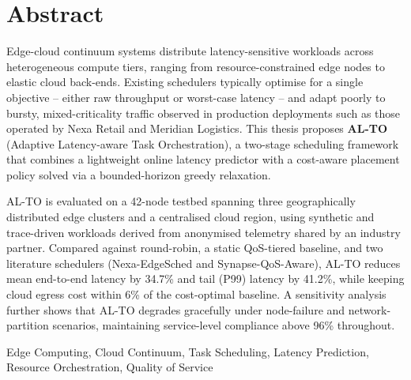 \chapter*{Abstract}

\noindent Edge-cloud continuum systems distribute latency-sensitive workloads across heterogeneous compute tiers, ranging from resource-constrained edge nodes to elastic cloud back-ends. Existing schedulers typically optimise for a single objective -- either raw throughput or worst-case latency -- and adapt poorly to bursty, mixed-criticality traffic observed in production deployments such as those operated by Nexa Retail and Meridian Logistics. This thesis proposes \textbf{AL-TO} (Adaptive Latency-aware Task Orchestration), a two-stage scheduling framework that combines a lightweight online latency predictor with a cost-aware placement policy solved via a bounded-horizon greedy relaxation.

\noindent AL-TO is evaluated on a 42-node testbed spanning three geographically distributed edge clusters and a centralised cloud region, using synthetic and trace-driven workloads derived from anonymised telemetry shared by an industry partner. Compared against round-robin, a static QoS-tiered baseline, and two literature schedulers (Nexa-EdgeSched and Synapse-QoS-Aware), AL-TO reduces mean end-to-end latency by 34.7\% and tail (P99) latency by 41.2\%, while keeping cloud egress cost within 6\% of the cost-optimal baseline. A sensitivity analysis further shows that AL-TO degrades gracefully under node-failure and network-partition scenarios, maintaining service-level compliance above 96\% throughout.

\vspace{0.6cm}
\begin{tcolorbox}[
  colback=white,colframe=bitsnavy,boxrule=0.8pt,arc=2pt,
  left=10pt,right=10pt,top=8pt,bottom=8pt,
  title={\faFile\ \ Keywords},fonttitle=\bfseries\color{white},
  colbacktitle=bitsnavy,coltitle=white
]
\small Edge Computing, Cloud Continuum, Task Scheduling, Latency Prediction, Resource Orchestration, Quality of Service
\end{tcolorbox}

